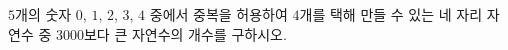 $5$개의 숫자 $0$, $1$, $2$, $3$, $4$ 중에서 중복을 허용하여 $4$개를 택해 만들 수 있는 네 자리 자연수 중 $3000$보다 큰 자연수의 개수를 구하시오.
